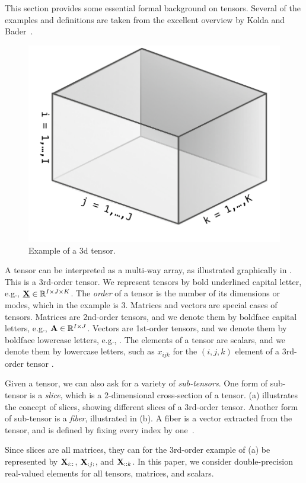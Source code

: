 This section provides some essential formal background on tensors. Several of the examples and definitions are taken from the excellent overview by Kolda and Bader~\cite{Kolda:2009}.

\begin{figure}
  \centering\includegraphics[width=0.4\linewidth]{figs/3dtensor}
  \caption{Example of a 3d tensor.}
  \label{fig:3dtensor}
\end{figure}

A tensor can be interpreted as a multi-way array, as illustrated graphically in . This is a 3rd-order tensor. 
We represent tensors by bold underlined capital letter, e.g., $\T{X} \in \R^{I \times J \times K}$. 
The \emph{order} of a tensor is the number of its dimensions or modes, which in the example is 3.
Matrices and vectors are special cases of tensors.
Matrices are 2nd-order tensors, and we denote them by boldface capital letters, e.g., $\M{A} \in \R^{I \times J}$.
Vectors are 1st-order tensors, and we denote them by boldface lowercase letters, e.g., .
The elements of a tensor are scalars, and we denote them by lowercase letters, such as $x_{ijk}$ for the $(i,j,k)$ element of a 3rd-order tensor .

Given a tensor, we can also ask for a variety of \emph{sub-tensors}.
One form of sub-tensor is a \emph{slice}, which is a 2-dimensional cross-section of a tensor.
(a) illustrates the concept of slices, showing different slices of a 3rd-order tensor.
Another form of sub-tensor is a \emph{fiber}, illustrated in (b).
A fiber is a vector extracted from the tensor, and is defined by fixing every index by one~\cite{Kolda:2009}.

Since slices are all matrices, they can for the 3rd-order example of (a) be represented by $\M{X}_{i::}$, $\M{X}_{:j:}$, and $\M{X}_{::k}$.
In this paper, we consider double-precision real-valued elements for all tensors, matrices, and scalars.

